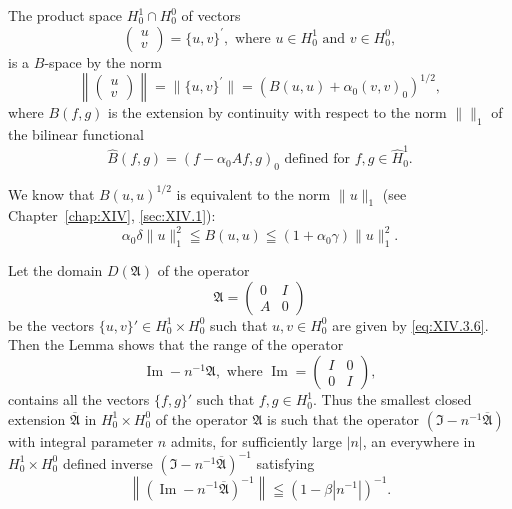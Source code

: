 \begin{corollaryu} The product space $H_{0}^{1} \cap H_{0}^{0}$ of vectors 
\begin{equation}\label{eq:XIV.3.7}
\begin{pmatrix}u \\ v\end{pmatrix} = \{u, v \} ^{\prime}, \text{ where } u \in H _{0} ^{1} \text{ and } v \in H _{0} ^{0},
\end{equation}
is a $B$-space by the norm 
\begin{equation}\label{eq:XIV.3.8}
\left\| \begin{pmatrix}u \\ v\end{pmatrix} \right\| = \| \{u, v \} ^{\prime} \| = (B (u, u) + \alpha_{0} (v, v) _{0}) ^{1/2},
\end{equation}
where $B(f, g)$ is the extension by continuity with respect to the norm $\|\|_1$ of the bilinear functional 
\[
\hat {B} (f, g) = (f - \alpha_{0} A f, g) _{0} \text{ defined for } f, g \in \hat {H} _{0} ^{1}.
\]
\end{corollaryu}

We know that $B(u, u)^{1/2}$ is equivalent to the norm $\|u\|_1$ (see Chapter~\ref{chap:XIV}, \ref{sec:XIV.1}): 
\begin{equation}\label{eq:XIV.3.9}
\alpha_{0} \delta \| u \| _{1} ^{2} \leqq B (u, u) \leqq (1 + \alpha_{0} \gamma) \| u \| _{1} ^{2}.
\end{equation}

Let the domain $D(\mathfrak{A})$ of the operator 
\begin{equation}\label{eq:XIV.3.10}
\mathfrak {A} = \begin{pmatrix}0 & I \\ A & 0\end{pmatrix}
\end{equation}
be the vectors $\{u, v\}' \in H_0^1 \times H_0^0$ such that $u, v \in H_0^0$ are given by \eqref{eq:XIV.3.6}. Then the Lemma shows that the range of the operator 
\[
\operatorname{Im} - n ^{-1} \mathfrak {A}, \text{ where } \operatorname{Im} = \begin{pmatrix}I & 0 \\ 0 & I\end{pmatrix},
\]
contains all the vectors $\{f, g\}'$ such that $f, g \in H_0^1$. Thus the smallest closed extension $\overline{\mathfrak{A}}$ in $H_0^1 \times H_0^0$ of the operator $\mathfrak{A}$ is such that the operator $(\mathfrak{I} - n^{-1} \overline{\mathfrak{A}})$ with integral parameter $n$ admits, for sufficiently large $|n|$, an everywhere in $H_0^1 \times H_0^0$ defined inverse $(\mathfrak{I} - n^{-1} \overline{\mathfrak{A}})^{-1}$ satisfying 
\begin{equation}\label{eq:XIV.3.11}
\left\| (\operatorname{Im} - n ^{-1} \overline {{{\mathfrak {A}}}}) ^{-1} \right\| \leqq (1 - \beta | n ^{-1} |) ^{-1}.
\end{equation}

